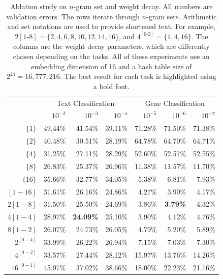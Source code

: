 \documentclass{article}
\begin{document}
\begin{table}[t]
  \caption{Ablation study on \(n\)-gram set and weight decay. All numbers are validation errors. The rows iterate through \(n\)-gram sets. Arithmetic and set notations are used to provide shortened text. For example, \(2[1\text{-}8] = \{2,4,6,8,10,12,14,16\}\), and \(4^{[0\text{-}2]}=\{1,4,16\}\). The columns are the weight decay parameters, which are differently chosen depending on the tasks. All of these experiments use an embedding dimension of 16 and a hash table size of \(2^{24}=16,777,216\). The best result for each task is highlighted using a bold font.}
  \label{tab:gram}
  \begin{center}
    \begin{tabular}{r|rrr|rrr}
      \hline
      & \multicolumn{3}{|c}{Text Classification}  & \multicolumn{3}{|c}{Gene Classification} \\
      & \(10^{-2}\) & \(10^{-3}\) & \(10^{-4}\) & \(10^{-5}\) & \(10^{-6}\) & \(10^{-7}\) \\ \hline
      \(\{1\}\) & 49.44\% & 41.54\% & 39.11\% & 71.28\% & 71.50\% & 71.38\% \\
      \(\{2\}\) & 40.48\% & 30.51\% & 28.19\% & 64.78\% & 64.70\% & 64.71\% \\
      \(\{4\}\) & 31.25\% & 27.11\% & 28.29\% & 52.60\% & 52.57\% & 52.55\% \\
      \(\{8\}\) & 26.83\% & 25.37\% & 26.96\% & 11.38\% & 11.57\% & 11.70\% \\
      \(\{16\}\) & 35.66\% & 32.77\% & 34.05\% & 5.38\% & 6.81\% & 7.93\% \\
      \([1-16]\) & 31.61\% & 26.16\% & 24.86\% & 4.27\% & 3.90\% & 4.17\% \\
      \(2[1-8]\) & 31.50\% & 25.50\% & 24.69\% & 3.86\% & \textbf{3.79\%} & 4.32\% \\
      \(4[1-4]\) & 28.97\% & \textbf{24.09\%} & 25.10\% & 3.90\% & 4.12\% & 4.76\% \\
      \(8[1-2]\) & 26.07\% & 24.73\% & 26.05\% & 4.79\% & 5.20\% & 5.89\% \\
      \(2^{[0-4]}\) & 33.99\% & 26.22\% & 26.94\% & 7.15\% & 7.03\% & 7.30\% \\
      \(4^{[0-2]}\) & 33.57\% & 27.44\% & 28.12\% & 15.97\% & 13.76\% & 14.26\% \\
      \(16^{[0-1]}\) & 45.97\% & 37.02\% & 38.66\% & 18.00\% & 22.23\% & 21.16\%\\
    \hline
    \end{tabular}
  \end{center}
\end{table}
\end{document}
